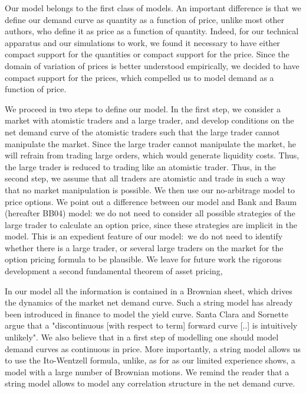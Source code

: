 \documentclass{article}
\begin{document}
Our model belongs to the first class of models. An important difference is
that we define our demand curve as quantity as a function of price, unlike
most other authors, who define it as price as a function of quantity.
Indeed, for our technical apparatus and our simulations to work, we found it
necessary to have either compact support for the quantities or compact
support for the price. Since the domain of variation of prices is better
understood empirically, we decided to have compact support for the prices,
which compelled us to model demand as a function of price.

We proceed in two steps to define our model. In the first step, we consider
a market with atomistic traders and a large trader, and develop conditions
on the net demand curve of the atomistic traders such that the large trader
cannot manipulate the market. Since the large trader cannot manipulate the
market, he will refrain from trading large orders, which would generate
liquidity costs. Thus, the large trader is reduced to trading like an
atomistic trader. Thus, in the second step, we assume that all traders are
atomistic and trade in such a way that no market manipulation is possible.
We then use our no-arbitrage model to price options. We point out a
difference between our model and Bank and Baum (hereafter BB04) model: we do
not need to consider all possible strategies of the large trader to
calculate an option price, since these strategies are implicit in the model.
This is an expedient feature of our model:\ we do not need to identify
whether there is a large trader, or several large traders on the market for
the option pricing formula to be plausible. We leave for future work the
rigorous development a second fundamental theorem of asset pricing,

In our model all the information is contained in a Brownian sheet, which
drives the dynamics of the market net demand curve. Such a string model has
already been introduced in finance to model the yield curve. Santa Clara and
Sornette \cite{SCS01} argue that a "discontinuous [with respect to term]
forward curve [..] is intuitively unlikely". We also believe that in a first
step of modelling one should model demand curves as continuous in price.
More importantly, a string model allows us to use the Ito-Wentzell formula,
unlike, as for as our limited experience shows, a model with a large number
of Brownian motions. We remind the reader that a string model allows to
model any correlation structure in the net demand curve.
\end{document}
